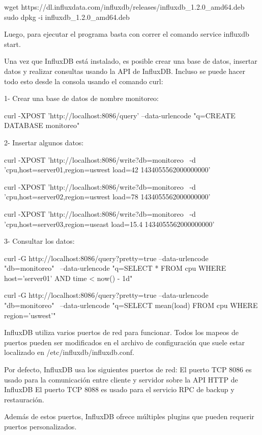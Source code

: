 wget https://dl.influxdata.com/influxdb/releases/influxdb_1.2.0_amd64.deb
sudo dpkg -i influxdb_1.2.0_amd64.deb

Luego, para ejecutar el programa basta con correr el comando service influxdb start.

Una vez que InfluxDB está instalado, es posible crear una base de datos, insertar datos y realizar consultas usando la API de InfluxDB. Incluso se puede hacer todo esto desde la consola usando el comando curl:

1- Crear una base de datos de nombre monitoreo:

curl -XPOST 'http://localhost:8086/query' --data-urlencode "q=CREATE DATABASE monitoreo"

2- Insertar algunos datos:

curl -XPOST 'http://localhost:8086/write?db=monitoreo \
-d 'cpu,host=server01,region=uswest load=42 1434055562000000000'

curl -XPOST 'http://localhost:8086/write?db=monitoreo \
-d 'cpu,host=server02,region=uswest load=78 1434055562000000000'

curl -XPOST 'http://localhost:8086/write?db=monitoreo \
-d 'cpu,host=server03,region=useast load=15.4 1434055562000000000'


3- Consultar los datos:

curl -G http://localhost:8086/query?pretty=true --data-urlencode "db=monitoreo" \
--data-urlencode "q=SELECT * FROM cpu WHERE host='server01' AND time < now() - 1d"

curl -G http://localhost:8086/query?pretty=true --data-urlencode "db=monitoreo" \
--data-urlencode "q=SELECT mean(load) FROM cpu WHERE region='uswest'"

InfluxDB utiliza varios puertos de red para funcionar. Todos los mapeos de puertos pueden ser modificados en el archivo de configuración que suele estar localizado en /etc/influxdb/influxdb.conf.

Por defecto, InfluxDB usa los siguientes puertos de red:
El puerto TCP 8086 es usado para la comunicación entre cliente y servidor sobre la API HTTP de InfluxDB
El puerto TCP 8088 es usado para el servicio RPC de backup y restauración.

Además de estos puertos, InfluxDB ofrece múltiples plugins que pueden requerir puertos personalizados. 
